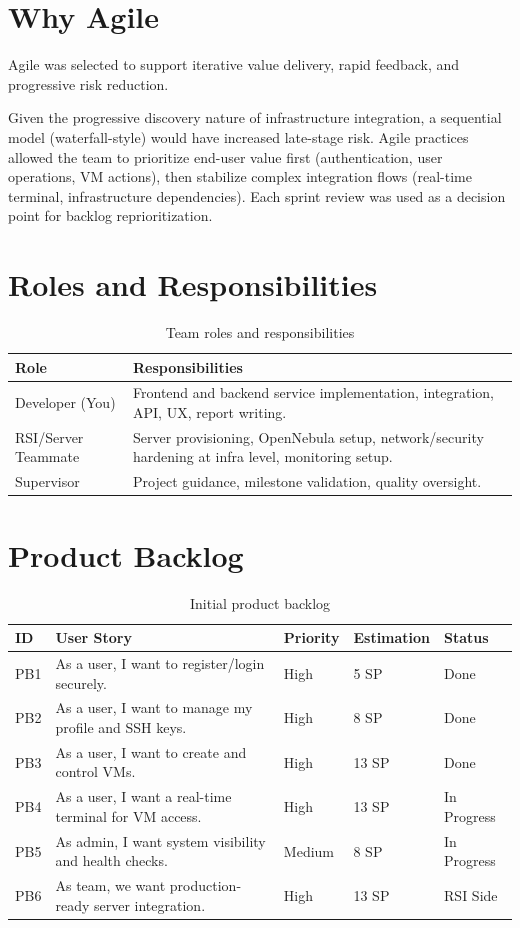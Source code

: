 \documentclass[12pt,a4paper]{report}
\begin{document}
\section{Why Agile}
Agile was selected to support iterative value delivery, rapid feedback, and progressive risk reduction.

Given the progressive discovery nature of infrastructure integration, a sequential model (waterfall-style) would have increased late-stage risk.
Agile practices allowed the team to prioritize end-user value first (authentication, user operations, VM actions), then stabilize complex integration flows (real-time terminal, infrastructure dependencies).
Each sprint review was used as a decision point for backlog reprioritization.

\section{Roles and Responsibilities}
\begin{table}[H]
\centering
\begin{tabular}{p{} p{}}
\toprule
\textbf{Role} & \textbf{Responsibilities} \\
\midrule
Developer (You) & Frontend and backend service implementation, integration, API, UX, report writing. \\
RSI/Server Teammate & Server provisioning, OpenNebula setup, network/security hardening at infra level, monitoring setup. \\
Supervisor & Project guidance, milestone validation, quality oversight. \\
\bottomrule
\end{tabular}
\caption{Team roles and responsibilities}
\end{table}

\section{Product Backlog}
\begin{table}[H]
\centering
\small
\begin{tabular}{p{} p{} p{} p{} p{}}
\toprule
\textbf{ID} & \textbf{User Story} & \textbf{Priority} & \textbf{Estimation} & \textbf{Status} \\
\midrule
PB1 & As a user, I want to register/login securely. & High & 5 SP & Done \\
PB2 & As a user, I want to manage my profile and SSH keys. & High & 8 SP & Done \\
PB3 & As a user, I want to create and control VMs. & High & 13 SP & Done \\
PB4 & As a user, I want a real-time terminal for VM access. & High & 13 SP & In Progress \\
PB5 & As admin, I want system visibility and health checks. & Medium & 8 SP & In Progress \\
PB6 & As team, we want production-ready server integration. & High & 13 SP & RSI Side \\
\bottomrule
\end{tabular}
\caption{Initial product backlog}
\end{table}
\end{document}
